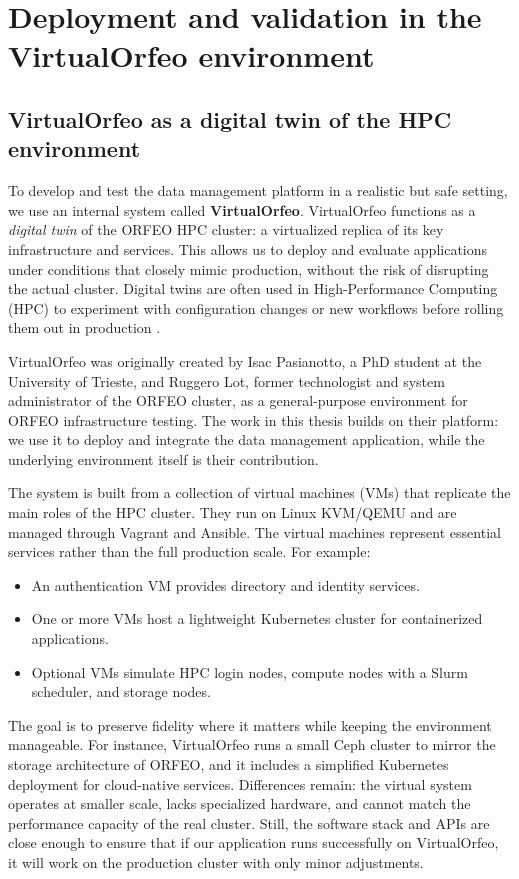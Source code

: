 \chapter{Deployment and validation in the VirtualOrfeo environment}\label{chap:virtualorfeo-deployment}

\section{VirtualOrfeo as a digital twin of the HPC environment}

To develop and test the data management platform in a realistic but safe setting, we use an internal system called \textbf{VirtualOrfeo}. VirtualOrfeo functions as a \emph{digital twin} of the ORFEO HPC cluster: a virtualized replica of its key infrastructure and services. This allows us to deploy and evaluate applications under conditions that closely mimic production, without the risk of disrupting the actual cluster. Digital twins are often used in High-Performance Computing (HPC) to experiment with configuration changes or new workflows before rolling them out in production \parencite{Ohmura2023TwdsDT}.

VirtualOrfeo was originally created by Isac Pasianotto, a PhD student at the University of Trieste, 
and Ruggero Lot, former technologist and system administrator of the ORFEO cluster, 
as a general-purpose environment for ORFEO infrastructure testing. 
The work in this thesis builds on their platform: we use it to deploy and integrate the data management application, 
while the underlying environment itself is their contribution.

The system is built from a collection of virtual machines (VMs) that replicate the main roles of the HPC cluster. They run on Linux KVM/QEMU and are managed through Vagrant and Ansible. The virtual machines represent essential services rather than the full production scale. For example:  

\begin{itemize}
	\item An authentication VM provides directory and identity services.  
	\item One or more VMs host a lightweight Kubernetes cluster for containerized applications.  
	\item Optional VMs simulate HPC login nodes, compute nodes with a Slurm scheduler, and storage nodes.  
\end{itemize}

The goal is to preserve fidelity where it matters while keeping the environment manageable. For instance, VirtualOrfeo runs a small Ceph cluster to mirror the storage architecture of ORFEO, and it includes a simplified Kubernetes deployment for cloud-native services. Differences remain: the virtual system operates at smaller scale, lacks specialized hardware, and cannot match the performance capacity of the real cluster. Still, the software stack and APIs are close enough to ensure that if our application runs successfully on VirtualOrfeo, it will work on the production cluster with only minor adjustments.

